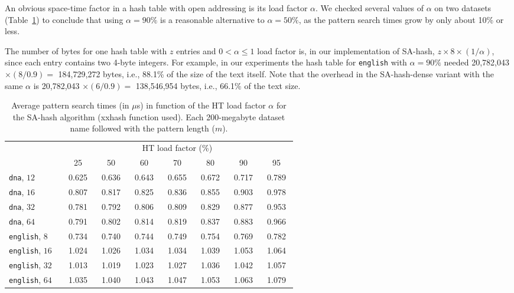 \documentclass{cai}
\begin{document}
An obvious space-time factor in a hash table with open addressing 
is its load factor $\alpha$. 
We checked several values of $\alpha$ on two datasets 
(Table~\ref{table:HT_lf}) 
to conclude that using $\alpha = 90\%$ 
is a reasonable alternative 
to $\alpha = 50\%$, as the pattern search times grow by only about 10\% or less.

The number of bytes for one hash table with $z$ entries 
and $0 < \alpha \leq 1$ load factor is, 
in our implementation of SA-hash, $z \times 8 \times (1/\alpha)$, 
since each entry contains two 4-byte integers.
For example, in our experiments the hash table for \texttt{english} 
with $\alpha = 90\%$
needed 20,782,043 $\times (8/0.9) = $ 184,729,272 bytes, i.e.,  88.1\%
of the size of the text itself.
Note that the overhead in the SA-hash-dense variant with the same $\alpha$ 
is 20,782,043 $\times (6/0.9) = $ 138,546,954 bytes, i.e.,  66.1\% 
of the text size.


\begin{table}
\centering
\begin{tabular}{lccccccc}
\hline
                    & \multicolumn{7}{c}{HT load factor (\%)}  \\
\cline{2-8}
     &~~25~~&~~50~~&~~60~~&~~70~~&~~80~~&~~90~~&~~95~~ \\
\hline
\texttt{dna}, $12~~~$ & 0.625 & 0.636 & 0.643 & 0.655 & 0.672 & 0.717 & 0.789 \\
\texttt{dna}, $16~~~$ & 0.807 & 0.817 & 0.825 & 0.836 & 0.855 & 0.903 & 0.978 \\
\texttt{dna}, $32~~~$ & 0.781 & 0.792 & 0.806 & 0.809 & 0.829 & 0.877 & 0.953 \\
\texttt{dna}, $64~~~$ & 0.791 & 0.802 & 0.814 & 0.819 & 0.837 & 0.883 & 0.966 \\
\texttt{english}, $8~~~$ & 0.734 & 0.740 & 0.744 & 0.749 & 0.754 & 0.769 & 0.782 \\
\texttt{english}, $16~~~$ & 1.024 & 1.026 & 1.034 & 1.034 & 1.039 & 1.053 & 1.064 \\
\texttt{english}, $32~~~$ & 1.013 & 1.019 & 1.023 & 1.027 & 1.036 & 1.042 & 1.057 \\
\texttt{english}, $64~~~$ & 1.035 & 1.040 & 1.043 & 1.047 & 1.053 & 1.063 & 1.079 \\
\hline
\end{tabular}
\vspace{4mm}
\caption{Average pattern search times (in $\mu$s) in function of the HT load factor 
$\alpha$ for the SA-hash algorithm (xxhash function used). Each 200-megabyte  dataset name followed with the pattern length ($m$).}
\label{table:HT_lf}
\end{table}
\end{document}
